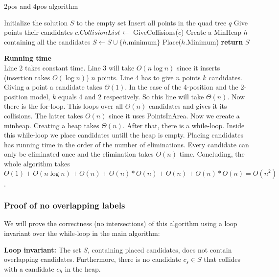\documentclass[crop=false,a4paper,oneside,11pt]{article}
\begin{document}
\begin{algorithm}[H]
\caption{2pos and 4pos algorithm}
\begin{algorithmic}[1]
\State Initialize the solution $S$ to the empty set
\State Insert all points in the quad tree $q$
\State Give points their candidates
\State $c.CollisionList\gets$ GiveCollisions($c$)
\EndFor
\State Create a MinHeap $h$ containing all the candidates
\State $S\gets S\cup \{h.$minimum$\}$
\State Place($h$.Minimum)
\EndWhile
\State \textbf{return} $S$
\EndProcedure
\end{algorithmic}
\end{algorithm}
\textbf{Running time}\\
Line 2 takes constant time. Line 3 will take $O(n\log n)$ since it inserts (insertion takes $O(\log n)$) $n$ points. Line 4 has to give $n$ points $k$ candidates. Giving a point a candidate takes $\Theta(1)$. In the case of the 4-position and the 2-position model, $k$ equals 4 and 2 respectively. So this line will take $\Theta(n)$. Now there is the for-loop. This loops over all $\Theta(n)$ candidates and gives it its collisions. The latter takes $O(n)$ since it uses PointsInArea. Now we create a minheap. Creating a heap takes $\Theta(n)$. After that, there is a while-loop. Inside this while-loop we place candidates untill the heap is empty. Placing candidates has running time in the order of the number of eliminations. Every candidate can only be eliminated once and the elimination takes $O(n)$ time. Concluding, the whole algorithm takes $\Theta(1)+O(n\log n)+\Theta(n)+\Theta(n)*O(n)+\Theta(n)+\Theta(n)*O(n)=O(n^2)$.

\subsubsection{Proof of no overlapping labels}
We will prove the correctness (no intersections) of this algorithm using a loop invariant over the while-loop in the main algorithm:

\textbf{Loop invariant:} The set $S$, containing placed candidates, does not contain overlapping candidates. Furthermore, there is no candidate $c_s\in S$ that collides with a candidate $c_h$ in the heap.
\end{document}
